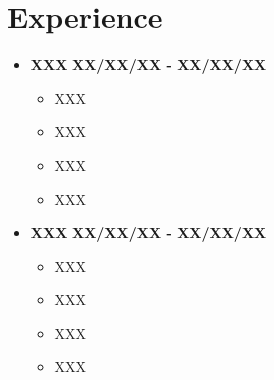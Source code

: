\documentclass{report} %
\begin{document}
\section*{Experience}
\small %
\begin{itemize}
    \item{\small \textbf{XXX}} %
    \newline \footnotesize \textbf{XX/XX/XX - XX/XX/XX} %
    \begin{itemize}
        \item XXX %
        \item XXX
        \item XXX
        \item XXX
    \end{itemize}
\end{itemize}
\vspace{3mm} %
\begin{itemize}
    \item{\small \textbf{XXX}} %
    \newline \footnotesize \textbf{XX/XX/XX - XX/XX/XX} %
    \begin{itemize}
        \item XXX
        \item XXX
        \item XXX
        \item XXX
    \end{itemize}
\end{itemize}

\end{document}
